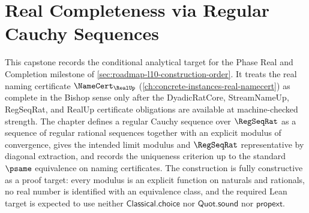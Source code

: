 \chapter{Real Completeness via Regular Cauchy Sequences}
\label{ch:visions-real-completeness}

This capstone records the conditional analytical target for the Phase Real and Completion milestone of \autoref{sec:roadmap-l10-construction-order}. It treats the real naming certificate $\NameCert_{\RealUp}$ (\autoref{ch:concrete-instances-real-namecert}) as complete in the Bishop sense only after the DyadicRatCore, StreamNameUp, RegSeqRat, and RealUp certificate obligations are available at machine-checked strength. The chapter defines a regular Cauchy sequence over $\RegSeqRat$ as a sequence of regular rational sequences together with an explicit modulus of convergence, gives the intended limit modulus and $\RegSeqRat$ representative by diagonal extraction, and records the uniqueness criterion up to the standard $\psame$ equivalence on naming certificates. The construction is fully constructive as a proof target: every modulus is an explicit function on naturals and rationals, no real number is identified with an equivalence class, and the required Lean target is expected to use neither $\mathsf{Classical.choice}$ nor $\mathsf{Quot.sound}$ nor $\mathsf{propext}$.













